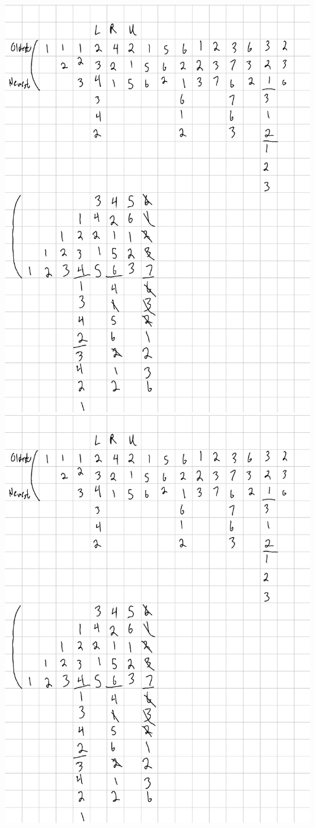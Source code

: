\documentclass{article}
\begin{document}
\includegraphics[scale=0.5,page=1]{Q2.pdf}
\includegraphics[scale=0.5,page=2]{Q2.pdf}
\end{document}
